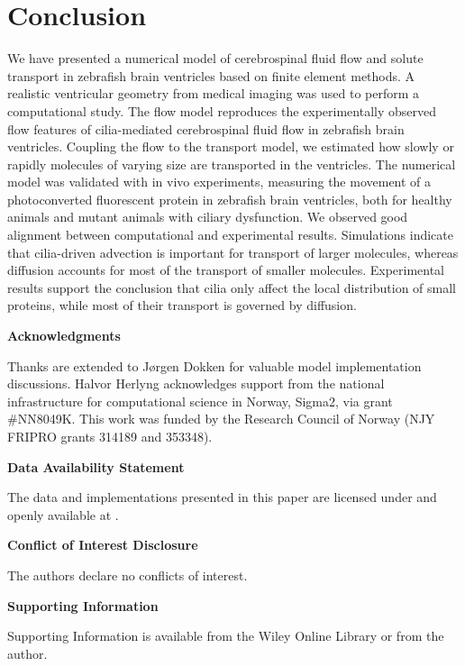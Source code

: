 \documentclass{WileyMSP-template}
\begin{document}
\section{Conclusion}
We have presented a numerical model
of cerebrospinal fluid flow and solute transport in
zebrafish brain ventricles based on finite element methods.
A realistic ventricular geometry from medical imaging was used to perform a
computational study. The flow model reproduces
the experimentally observed flow features of cilia-mediated cerebrospinal fluid
flow in zebrafish brain ventricles. Coupling the flow to the transport model,
we estimated how slowly or rapidly molecules of varying size are transported in
the ventricles. 
The numerical model was validated with in vivo experiments, measuring the movement of
a photoconverted fluorescent protein in zebrafish brain ventricles,
both for healthy animals and mutant animals with ciliary dysfunction.
We observed good alignment between computational and experimental results.
Simulations indicate that cilia-driven advection is important
for transport of larger molecules, whereas diffusion accounts for most of
the transport of smaller molecules. 
Experimental results support the conclusion that cilia only affect the
local distribution of small proteins,
while most of their transport is governed by diffusion. 

\medskip
\textbf{Acknowledgments} \par 
Thanks are extended to J\o rgen Dokken for valuable model implementation discussions.
Halvor Herlyng acknowledges support from the national infrastructure for computational
science in Norway, Sigma2, via grant \#NN8049K.
This work was funded by the Research Council of Norway (NJY FRIPRO grants 314189 and 353348).

\medskip
\textbf{Data Availability Statement} \par
The data and implementations presented in this paper are licensed under 
and openly available at .

\medskip
\textbf{Conflict of Interest Disclosure} \par
The authors declare no conflicts of interest.


\medskip
\textbf{Supporting Information} \par %
Supporting Information is available from the Wiley Online Library or from the author.
\end{document}
